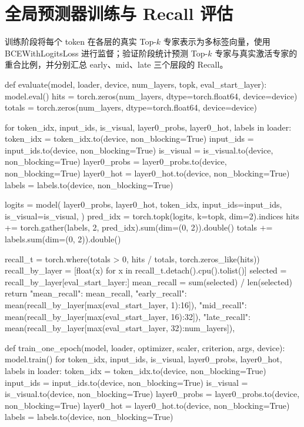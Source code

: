 \section{全局预测器训练与 Recall 评估}
训练阶段将每个 token 在各层的真实 Top-$k$ 专家表示为多标签向量，使用 BCEWithLogitsLoss 进行监督；验证阶段统计预测 Top-$k$ 专家与真实激活专家的重合比例，并分别汇总 early、mid、late 三个层段的 Recall。
\begin{CodeBlock}
def evaluate(model, loader, device, num_layers, topk, eval_start_layer):
    model.eval()
    hits = torch.zeros(num_layers, dtype=torch.float64, device=device)
    totals = torch.zeros(num_layers, dtype=torch.float64, device=device)

    for token_idx, input_ids, is_visual, layer0_probs, layer0_hot, labels in loader:
        token_idx = token_idx.to(device, non_blocking=True)
        input_ids = input_ids.to(device, non_blocking=True)
        is_visual = is_visual.to(device, non_blocking=True)
        layer0_probs = layer0_probs.to(device, non_blocking=True)
        layer0_hot = layer0_hot.to(device, non_blocking=True)
        labels = labels.to(device, non_blocking=True)

        logits = model(
            layer0_probs,
            layer0_hot,
            token_idx,
            input_ids=input_ids,
            is_visual=is_visual,
        )
        pred_idx = torch.topk(logits, k=topk, dim=2).indices
        hits += torch.gather(labels, 2, pred_idx).sum(dim=(0, 2)).double()
        totals += labels.sum(dim=(0, 2)).double()

    recall_t = torch.where(totals > 0, hits / totals, torch.zeros_like(hits))
    recall_by_layer = [float(x) for x in recall_t.detach().cpu().tolist()]
    selected = recall_by_layer[eval_start_layer:]
    mean_recall = sum(selected) / len(selected)
    return {
        "mean_recall": mean_recall,
        "early_recall": mean(recall_by_layer[max(eval_start_layer, 1):16]),
        "mid_recall": mean(recall_by_layer[max(eval_start_layer, 16):32]),
        "late_recall": mean(recall_by_layer[max(eval_start_layer, 32):num_layers]),
    }


def train_one_epoch(model, loader, optimizer, scaler, criterion, args, device):
    model.train()
    for token_idx, input_ids, is_visual, layer0_probs, layer0_hot, labels in loader:
        token_idx = token_idx.to(device, non_blocking=True)
        input_ids = input_ids.to(device, non_blocking=True)
        is_visual = is_visual.to(device, non_blocking=True)
        layer0_probs = layer0_probs.to(device, non_blocking=True)
        layer0_hot = layer0_hot.to(device, non_blocking=True)
        labels = labels.to(device, non_blocking=True)


\end{CodeBlock}
